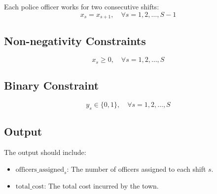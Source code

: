 \documentclass{article}
\begin{document}
Each police officer works for two consecutive shifts:
\[
x_{s} = x_{s+1}, \quad \forall s = 1, 2, \ldots, S-1
\]

\subsection*{Non-negativity Constraints}
\[
x_s \geq 0, \quad \forall s = 1, 2, \ldots, S
\]

\subsection*{Binary Constraint}
\[
y_s \in \{0, 1\}, \quad \forall s = 1, 2, \ldots, S
\]

\subsection*{Output}
The output should include:
\begin{itemize}
    \item \( \text{officers\_assigned}_s \): The number of officers assigned to each shift \( s \).
    \item \( \text{total\_cost} \): The total cost incurred by the town.
\end{itemize}
\end{document}
